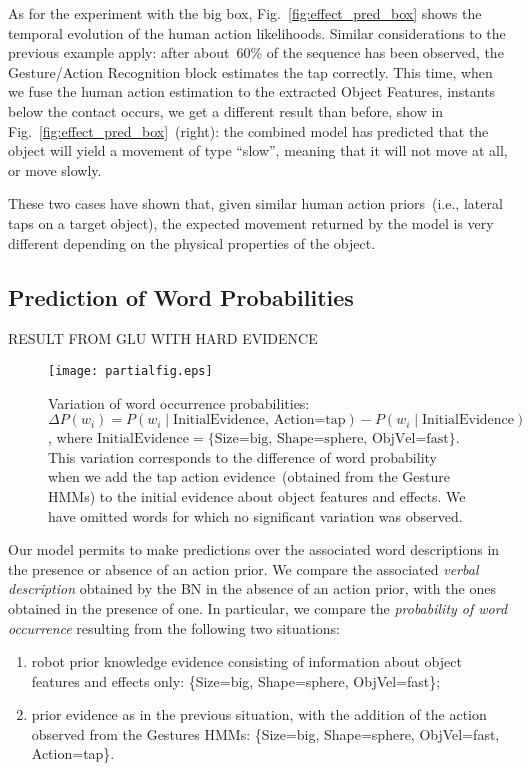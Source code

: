 As for the experiment with the big box, Fig.~\ref{fig:effect_pred_box} shows the temporal evolution of the human action likelihoods.
Similar considerations to the previous example apply: after about~$60$\% of the sequence has been observed, the Gesture/Action Recognition block estimates the tap correctly.
This time, when we fuse the human action estimation to the extracted Object Features, instants below the contact occurs, we get a different result than before, show in Fig.~\ref{fig:effect_pred_box}~(right): the combined model has predicted that the object will yield a movement of type ``slow'', meaning that it will not move at all, or move slowly.

These two cases have shown that, given similar human action priors~(i.e., lateral taps on a target object), the expected movement returned by the model is very different depending on the physical properties of the object.

\subsection{Prediction of Word Probabilities}

RESULT FROM GLU WITH HARD EVIDENCE

\begin{figure}
\centering
\texttt{[image: partialfig.eps]}
\caption{Variation of word occurrence probabilities:
$\Delta P(w_i) = P(w_i \mid \text{InitialEvidence, Action=tap}) - P(w_i \mid \text{InitialEvidence})$, where $\text{InitialEvidence} = \{ \text{Size=big, Shape=sphere, ObjVel=fast} \}$.
This variation corresponds to the difference of word probability when we add the tap action evidence~(obtained from the Gesture \acp{HMM}) to the initial evidence about object features and effects. We have omitted words for which no significant variation was observed.}
\label{fig:probdiff}
\end{figure}

Our model permits to make predictions over the associated word descriptions in the presence or absence of an action prior.
We compare the associated \emph{verbal description} obtained by the \acl{BN} in the absence of an action prior, with the ones obtained in the presence of one.
In particular, we compare the \emph{probability of word occurrence} resulting from the following two situations:
\begin{enumerate}
\item robot prior knowledge evidence consisting of information about object features and effects only: %
\{Size=big, Shape=sphere, ObjVel=fast\};

\item prior evidence as in the previous situation, with the addition of the action observed from the Gestures \acp{HMM}: %
\{Size=big, Shape=sphere, ObjVel=fast, Action=tap\}.
\end{enumerate}

